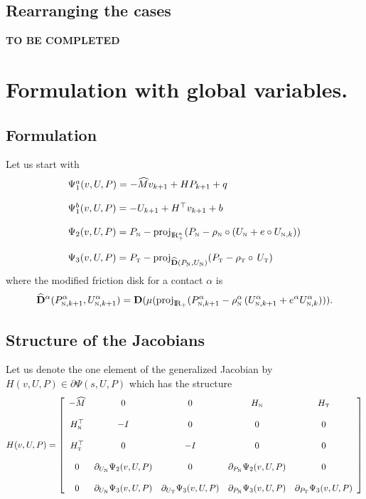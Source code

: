 \subsection{Rearranging the cases}

{\bf TO BE COMPLETED}
\section{Formulation with global variables.}

\subsection{Formulation}
Let us start with 
\begin{equation}
  \label{eq:GAC-L1}
  \begin{array}{l}
  \Psi_{1}^{a}(v,U,P) =  - \widehat M v_{k+1}  +  H P_{k+1}  + q \\ \\
  \Psi_{1}^{b}(v,U,P) =  - U_{k+1}  + H^\top v _{k+1}  + b \\ \\
  \Psi_2(v,U,P) =  P_{{\hbox{\tiny{N}}}} - \operatorname{proj}_{\mathrm{I\!R}^{a}_+} (P_{{\hbox{\tiny{N}}}} - \rho_{{\hbox{\tiny{N}}}}\circ (U_{{\hbox{\tiny{N}}}} +e \circ  U_{{\hbox{\tiny{N}}},k}) ) \\ \\
  \Psi_3(v,U,P) =  P_{{\hbox{\tiny{T}}}} - \operatorname{proj}_{\widehat {\bf D}(P_{{\hbox{\tiny{N}}}},U_{{\hbox{\tiny{N}}}})} (P_{{{\hbox{\tiny{T}}}}} - \rho_{{\hbox{\tiny{T}}}}\circ \,U_{{\hbox{\tiny{T}}}} )
\end{array}
\end{equation}
where the modified friction disk for a contact $\alpha$ is
\begin{equation}\label{eq:GAC-L2}
  \widehat {\bf D}^\alpha(P^\alpha_{{\hbox{\tiny{N}}},k+1},U_{{\hbox{\tiny{N}}},k+1}^{\alpha}) = {\bf D}(\mu(\operatorname{proj}_{\mathrm{I\!R}_+} (P^\alpha_{{\hbox{\tiny{N}}},k+1} - \rho^\alpha_{{\hbox{\tiny{N}}}}\,(U_{{\hbox{\tiny{N}}},k+1}^{\alpha}+e^\alpha U_{{\hbox{\tiny{N}}},k}^{\alpha}) )).
\end{equation}

\subsection{Structure of the Jacobians}

 Let us denote the one element of the  generalized Jacobian by  $ H(v,U,P) \in \partial \Psi(s,U,P)$ which has the structure
\begin{equation}
  \label{eq:GAC-L3}
   H(v,U,P) = 
   \left[\begin{array}{ccccc}
       - \widehat M & 0 & 0 & H_{{\hbox{\tiny{N}}}} & H_{{\hbox{\tiny{T}}}} \\ \\
        H_{{\hbox{\tiny{N}}}}^\top &  - I & 0 & 0 &0 \\ \\
        H_{{\hbox{\tiny{T}}}}^\top &  0  & -I & 0 &0 \\ \\
        0 & \partial_{U_{{\hbox{\tiny{N}}}}} \Psi_2(v,U,P) & 0 &   \partial_{P_{{\hbox{\tiny{N}}}}} \Psi_2(v,U,P) & 0 \\ \\
        0 & \partial_{U_{{\hbox{\tiny{N}}}}} \Psi_3(v,U,P) &  \partial_{U_{{\hbox{\tiny{T}}}}} \Psi_3(v,U,P) &  \partial_{P_{{\hbox{\tiny{N}}}}} \Psi_3(v,U,P)  & \partial_{P_{{\hbox{\tiny{T}}}}} \Psi_3(v,U,P)
   \end{array}\right]
\end{equation}


